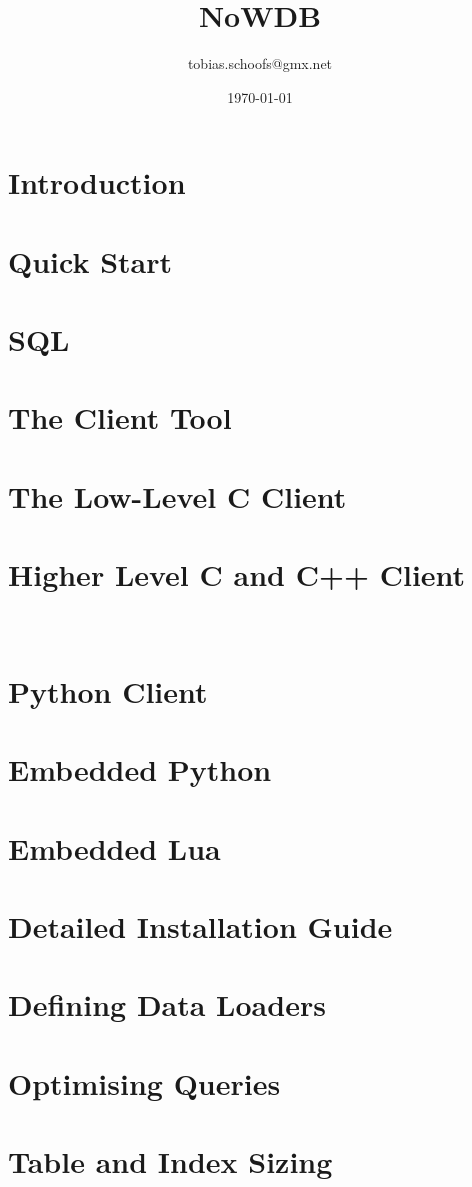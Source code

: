 \documentclass{scrreprt}
\begin{document}
\setlength{\parindent}{0pt}
\setlength{\parskip}{8pt}

\title {NoWDB}
\author {tobias.schoofs@gmx.net}
\date{\today}
\maketitle
\tableofcontents

\chapter{Introduction}\label{chpt_intro} 

\chapter{Quick Start}\label{chpt_quickst}


\chapter{SQL}\label{chpt_sql}

\chapter{The Client Tool}\label{chpt_clienttool}

\chapter{The Low-Level C Client}\label{chpt_llc}

\chapter{Higher Level C and C++ Client}\label{chpt_ccpp}
\CC\

\chapter{Python Client}\label{chpt_pythonclient}

\chapter{Embedded Python}\label{chpt_pythonemb}

\chapter{Embedded Lua}\label{chpt_luaemb}

\chapter{Detailed Installation Guide}\label{chpt_install}

\chapter{Defining Data Loaders}\label{chpt_loader}

\chapter{Optimising Queries}\label{chpt_opt}

\chapter{Table and Index Sizing}\label{chpt_sizing}
\end{document}
